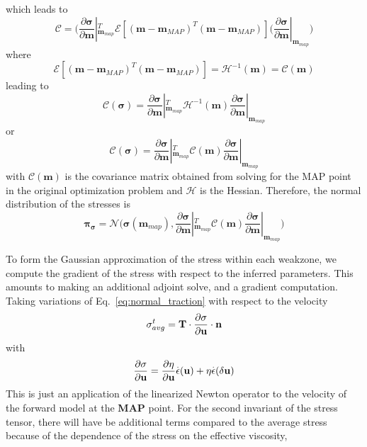 \documentclass[12pt]{article}
\newcommand{\mm}{{\ensuremath{\boldsymbol{m}}}}
\newcommand{\ppi}{{\ensuremath{\boldsymbol{\pi}}}}
\newcommand{\ssigma}{{\ensuremath{\boldsymbol{\sigma}}}}
\begin{document}
which leads to
\begin{equation}
\mathcal C = \big(\frac{\partial\ssigma}{\partial \mm}|_{\mm_{map}}^T \mathcal E[(\mm-\mm_{MAP})^T(\mm-\mm_{MAP})](\frac{\partial\ssigma}{\partial \mm}|_{\mm_{map}}\big)
\end{equation}
where 
\begin{equation}
  \mathcal E[(\mm-\mm_{MAP})^T(\mm-\mm_{MAP})] = \mathcal H^{-1}(\mm) = \mathcal C(\mm)
  \end{equation}
leading to
\begin{equation}
\mathcal C(\ssigma) = \frac{\partial\ssigma}{\partial \mm}|_{\mm_{map}}^T \mathcal H^{-1}(\mm)\frac{\partial\ssigma}{\partial \mm}|_{\mm_{map}}
\end{equation}
or 
\begin{equation}
\mathcal C(\ssigma) = \frac{\partial\ssigma}{\partial \mm}|_{\mm_{map}}^T \mathcal C(\mm)\frac{\partial\ssigma}{\partial \mm}|_{\mm_{map}}
\end{equation}
with $\mathcal C(\mm)$ is the covariance matrix obtained from solving for the MAP point in the original optimization problem
and $\mathcal H$ is the Hessian.
Therefore, the normal distribution of the stresses is
\begin{equation}
  \ppi_{\ssigma} = \mathcal N\big(\ssigma(\mm_{map}), \frac{\partial\ssigma}{\partial \mm}|_{\mm_{map}}^T \mathcal C(\mm)\frac{\partial\ssigma}{\partial \mm}|_{\mm_{map}}\big)
\end{equation}

To form the Gaussian approximation of the stress within each weakzone, we compute the gradient of the stress with respect to the inferred parameters. This amounts to making an additional adjoint solve, and a gradient computation. Taking variations of Eq.~\eqref{eq:normal_traction} with respect to the velocity
\begin{equation}
\sigma^t_{avg}=\textbf{T}\cdot\frac{\partial\sigma}{\partial \textbf u}\cdot \textbf n
\end{equation}
with
\begin{equation}
\frac{\partial\sigma}{\partial \textbf u} = \frac{\partial \eta}{\partial \textbf u}\overset{.}{\epsilon}(\textbf u)
                                            + \eta\overset{.}{\epsilon}(\delta \textbf u)
\end{equation}
This is just an application of the linearized Newton operator to the velocity of the forward model at the \textbf{MAP} point.
For the second invariant of the stress tensor, there will have be additional terms compared to the average stress because of the dependence of the stress on the effective viscosity,
\end{document}
